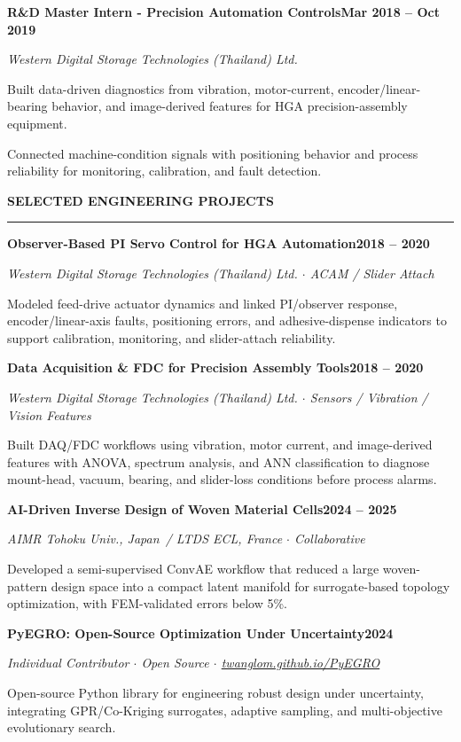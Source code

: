 \documentclass[a4paper,10pt]{article}
\newlength{\sbW}\setlength{\sbW}{63mm}
\newlength{\mnW}\setlength{\mnW}{130mm}
\newcommand{\mainsec}[1]{%
  \vspace{5pt}%
  {\color{accent}\small\bfseries\MakeUppercase{#1}}\par
  {\color{linecolor}\rule{\mnW}{0.8pt}}\par\vspace{2pt}%
}
\newcommand{\cventry}[4]{%
  \vspace{2pt}%
  \noindent\begin{minipage}[t]{\mnW}%
    {\color{darktext}\small\bfseries #1}\hfill{\color{accent}\scriptsize\bfseries #3}\par
    {\color{graytext}\footnotesize\itshape #2}\par\vspace{2pt}%
    {\footnotesize\color{bodytext}#4}%
  \end{minipage}\par%
}
\newcommand{\cvbullet}[1]{%
  {\footnotesize\color{bodytext}%
   \hspace{3pt}{\color{accent}\tiny$\blacktriangleright$}\enspace#1\par}%
}
\begin{document}
\begin{minipage}[t]{\dimexpr\textwidth-\sbW\relax}
\begin{minipage}[t]{\mnW}
\vspace{5pt}

\cventry{R\&D Master Intern - Precision Automation Controls}%
  {Western Digital Storage Technologies (Thailand) Ltd.}%
  {Mar 2018 -- Oct 2019}{%
  \cvbullet{Built data-driven diagnostics from vibration, motor-current, encoder/linear-bearing behavior, and image-derived features for HGA precision-assembly equipment.}
  \cvbullet{Connected machine-condition signals with positioning behavior and process reliability for monitoring, calibration, and fault detection.}%
}

\vspace*{10pt}

\mainsec{Selected Engineering Projects}

\cventry{Observer-Based PI Servo Control for HGA Automation}%
  {Western Digital Storage Technologies (Thailand) Ltd. $\cdot$ ACAM / Slider Attach}%
  {2018 -- 2020}{%
  Modeled feed-drive actuator dynamics and linked PI/observer response, encoder/linear-axis faults, positioning errors, and adhesive-dispense indicators to support calibration, monitoring, and slider-attach reliability.
}

\vspace{8pt}

\cventry{Data Acquisition \& FDC for Precision Assembly Tools}%
  {Western Digital Storage Technologies (Thailand) Ltd. $\cdot$ Sensors / Vibration / Vision Features}%
  {2018 -- 2020}{%
  Built DAQ/FDC workflows using vibration, motor current, and image-derived features with ANOVA, spectrum analysis, and ANN classification to diagnose mount-head, vacuum, bearing, and slider-loss conditions before process alarms.
}

\vspace{8pt}

\cventry{AI-Driven Inverse Design of Woven Material Cells}%
  {AIMR Tohoku Univ., Japan\ / LTDS ECL, France $\cdot$ Collaborative}%
  {2024 -- 2025}{%
  Developed a semi-supervised ConvAE workflow that reduced a large woven-pattern design space into a compact latent manifold for surrogate-based topology optimization, with FEM-validated errors below 5\%.
}

\vspace{8pt}

\cventry{PyEGRO: Open-Source Optimization Under Uncertainty}%
  {Individual Contributor \textnormal{$\cdot$} Open Source \textnormal{$\cdot$} \href{https://twanglom.github.io/PyEGRO/}{twanglom.github.io/PyEGRO}}%
  {2024}{%
  Open-source Python library for engineering robust design under uncertainty, integrating GPR/Co-Kriging surrogates, adaptive sampling, and multi-objective evolutionary search.
}
\vspace{8pt}


\end{minipage}
\end{minipage}
\end{document}

